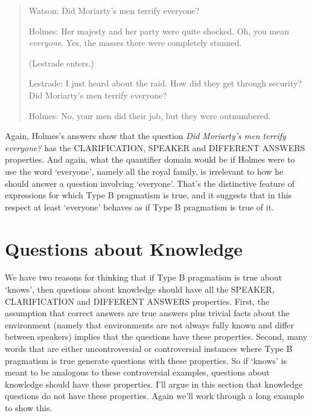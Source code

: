 \documentclass[
  11pt,
  letterpaper,
  DIV=11,
  numbers=noendperiod,
  twoside]{scrartcl}
\begin{document}
\begin{quote}
Watson: Did Moriarty's men terrify everyone?

Holmes: Her majesty and her party were quite shocked. Oh, you mean
\emph{everyone}. Yes, the masses there were completely stunned.

(Lestrade enters.)

Lestrade: I just heard about the raid. How did they get through
security? Did Moriarty's men terrify everyone?

Holmes: No, your men did their job, but they were outnumbered.
\end{quote}

Again, Holmes's answers show that the question \emph{Did Moriarty's men
terrify everyone?} has the CLARIFICATION, SPEAKER and DIFFERENT ANSWERS
properties. And again, what the quantifier domain would be if Holmes
were to use the word `everyone', namely all the royal family, is
irrelevant to how he should answer a question involving `everyone'.
That's the distinctive feature of expressions for which Type B
pragmatism is true, and it suggests that in this respect at least
`everyone' behaves as if Type B pragmatism is true of it.

\section{Questions about Knowledge}\label{questions-about-knowledge}

We have two reasons for thinking that if Type B pragmatism is true about
`knows', then questions about knowledge should have all the SPEAKER,
CLARIFICATION and DIFFERENT ANSWERS properties. First, the assumption
that correct answers are true answers plus trivial facts about the
environment (namely that environments are not always fully known and
differ between speakers) implies that the questions have these
properties. Second, many words that are either uncontroversial or
controversial instances where Type B pragmatism is true generate
questions with these properties. So if `knows' is meant to be analogous
to these controversial examples, questions about knowledge should have
these properties. I'll argue in this section that knowledge questions do
not have these properties. Again we'll work through a long example to
show this.
\end{document}
